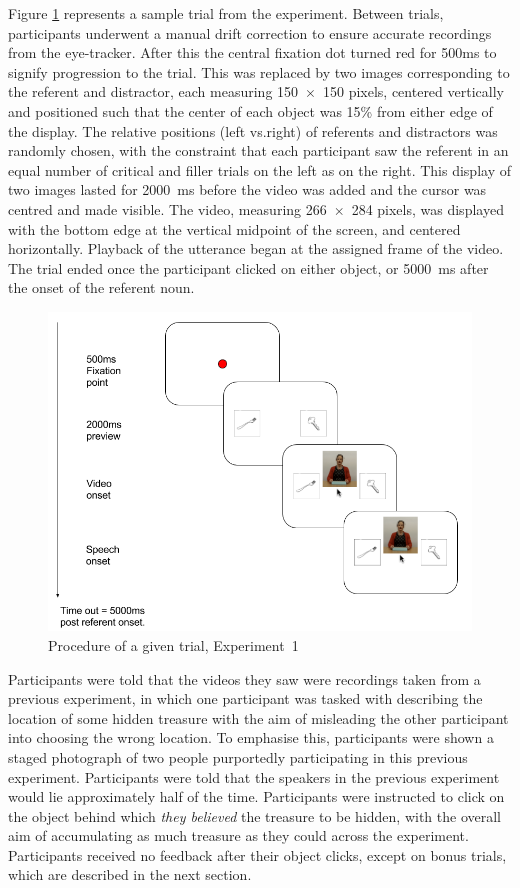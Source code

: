 \documentclass[a4paper,man,natbib]{apa6}
\begin{document}
Figure \ref{fig:v1_trial} represents a sample trial from the experiment. 
Between trials, participants underwent a manual drift correction to ensure accurate recordings from the eye-tracker.
After this the central fixation dot turned red for 500ms to signify progression to the trial. 
This was replaced by two images corresponding to the referent and distractor, each measuring 150~$\times$~150 pixels, centered vertically and positioned such that the center of each object was 15\% from either edge of the display. 
The relative positions (left vs.\@ right) of referents and distractors was randomly chosen, with the constraint that each participant saw the referent in an equal number of critical and filler trials on the left as on the right.
This display of two images lasted for 2000~ms before the video was added and the cursor was centred and made visible.
The video, measuring 266~$\times$~284 pixels, was displayed with the bottom edge at the vertical midpoint of the screen, and centered horizontally.
Playback of the utterance began at the assigned frame of the video.
The trial ended once the participant clicked on either object, or 5000~ms after the onset of the referent noun.

\begin{figure}[Ht]
  \centering
	\includegraphics[width=\linewidth]{./img/e7_trial.png}
  \caption{Procedure of a given trial, Experiment~1}
  \label{fig:v1_trial}
\end{figure}

Participants were told that the videos they saw were recordings taken from a previous experiment, in which one participant was tasked with describing the location of some hidden treasure with the aim of misleading the other participant into choosing the wrong location.
To emphasise this, participants were shown a staged photograph of two people purportedly participating in this previous experiment. 
Participants were told that the speakers in the previous experiment would lie approximately half of the time. 
Participants were instructed to click on the object behind which \textit{they believed} the treasure to be hidden, with the overall aim of accumulating as much treasure as they could across the experiment.
Participants received no feedback after their object clicks, except on bonus trials, which are described in the next section.
\end{document}
